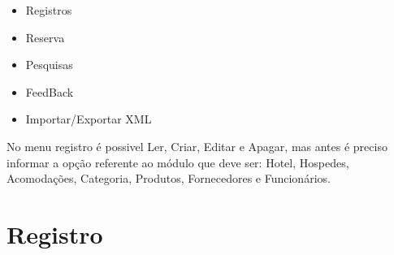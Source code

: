 \documentclass[titlepage]{article}
\begin{document}
				\begin{itemize}
					\item Registros
					\item Reserva
					\item Pesquisas
					\item FeedBack
					\item Importar/Exportar XML
				\end{itemize}

				No menu registro é possivel Ler, Criar, Editar e Apagar, mas antes é preciso informar a opção referente ao módulo que deve ser: Hotel, Hospedes, Acomodações, Categoria, Produtos, Fornecedores e Funcionários.\\

				\newpage
				\section{Registro}
\end{document}
